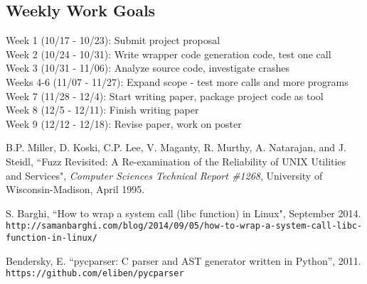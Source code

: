 \documentclass[10pt]{article}
\begin{document}
\subsection{Weekly Work Goals}
\noindent Week 1 (10/17 - 10/23): Submit project proposal\\
Week 2 (10/24 - 10/31): Write wrapper code generation code, test one call\\
Week 3 (10/31 - 11/06): Analyze source code, investigate crashes\\
Weeks 4-6 (11/07 - 11/27): Expand scope - test more calls and more programs\\
Week 7 (11/28 - 12/4): Start writing paper, package project code as tool\\
Week 8 (12/5 - 12/11): Finish writing paper\\
Week 9 (12/12 - 12/18): Revise paper, work on poster\\

\begin{thebibliography}{9}
	B.P. Miller, D. Koski, C.P. Lee, V. Maganty, R. Murthy, A. Natarajan, and J. Steidl, ``Fuzz Revisited: A Re-examination of the Reliability of UNIX Utilities and Services", \textit{Computer Sciences Technical Report \#1268}, University of Wisconsin-Madison, April 1995.
	
	S. Barghi, ``How to wrap a system call (libc function) in Linux", September 2014.\\
	\texttt{http://samanbarghi.com/blog/2014/09/05/how-to-wrap-a-system-call-libc-function-in-linux/}
	
	Bendersky, E. ``pycparser: C parser and AST generator written in Python'', 2011.\\
	\texttt{https://github.com/eliben/pycparser}
\end{thebibliography}
\end{document}
